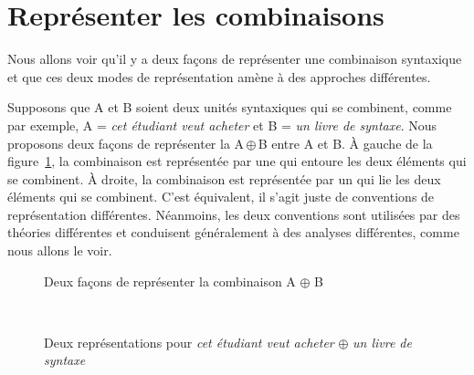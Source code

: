\section{Représenter les combinaisons}\label{sec:3.2.12}%
Nous allons voir qu’il y a deux façons de représenter une combinaison syntaxique et que ces deux modes de représentation amène à des approches différentes.


Supposons que A et B soient deux unités syntaxiques qui se combinent, comme par exemple, A = \textit{cet étudiant veut acheter} et B = \textit{un livre de syntaxe}. Nous proposons deux façons de représenter la  A\,${\oplus}$\,B entre A et B. À gauche de la figure~\ref{fig:combiAB}, la combinaison est représentée par une  qui entoure les deux éléments qui se combinent. À droite, la combinaison est représentée par un  qui lie les deux éléments qui se combinent. C’est équivalent, il s’agit juste de conventions de représentation différentes. Néanmoins, les deux conventions sont utilisées par des théories différentes et conduisent généralement à des analyses différentes, comme nous allons le voir.

\begin{figure}
\caption{\label{fig:combiAB}Deux façons de représenter la combinaison A $\oplus$ B}
\end{figure}

\begin{figure}
\medskip\\
\caption{Deux représentations pour \textit{cet étudiant veut acheter} $\oplus$ \textit{un livre de syntaxe}}
\end{figure}



